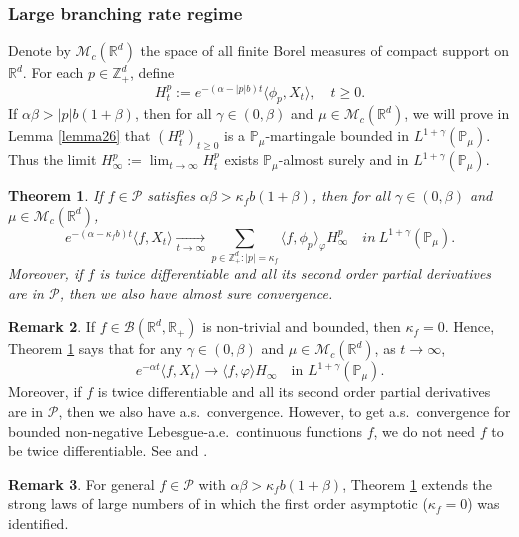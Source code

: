 \documentclass[12pt,a4paper]{amsart}
\theoremstyle{plain}
\newtheorem{thm}{Theorem}[section]
\theoremstyle{definition}
\newtheorem{rem}[thm]{Remark}
\numberwithin{equation}{section}
\begin{document}
\subsubsection{Large branching rate regime}
    Denote by $\mathcal M_c(\mathbb R^d)$ the space of all finite Borel measures of compact support on $\mathbb R^d$.
    For each $p\in \mathbb{Z}_+^d$, define
\[
    H_t^p
    := e^{-(\alpha-|p|b)t}\langle\phi_p,X_t\rangle,
    \quad t\geq 0.
\]
    If $\alpha\beta>|p|b(1+\beta)$, then for all $\gamma\in (0, \beta)$ and $\mu\in \mathcal M_c(\mathbb R^d)$,
      we will prove in Lemma \ref{lemma26} that $(H_t^p)_{t\geq 0}$ is a $\mathbb{P}_{\mu}$-martingale bounded in $L^{1+\gamma}(\mathbb{P}_{\mu})$.
    Thus the limit $H^p_{\infty}:=\lim_{t\rightarrow \infty}H_t^p$ exists $\mathbb{P}_{\mu}$-almost surely and in $L^{1+\gamma}(\mathbb{P}_{\mu})$.
 \begin{thm}
 \label{thm: law of large number}
     If $f \in \mathcal{P}$ satisfies $\alpha\beta>\kappa_fb(1+\beta)$, then
   for all
     $\gamma\in (0, \beta)$ and  $\mu\in \mathcal M_c(\mathbb R^d)$,
\[
    e^{-(\alpha-\kappa_fb)t}\langle f, X_t\rangle
       \xrightarrow[t\to \infty]{}\sum_{p\in \mathbb Z_+^d:|p|=\kappa_f}\langle f, \phi_p\rangle_{\varphi} H_{\infty}^p
    \quad in~ L^{1+\gamma}(\mathbb{P}_{\mu}).
\]
    Moreover, if $f$ is twice differentiable and all its second order partial derivatives are in $\mathcal{P}$, then we also have almost sure convergence.
\end{thm}
\begin{rem}
   If $f\in \mathcal B(\mathbb R^d, \mathbb R_+)$ is non-trivial and  bounded, then $\kappa_f=0$.
    Hence, Theorem \ref{thm: law of large number} says that
    for any $\gamma\in (0, \beta)$ and  $\mu\in \mathcal M_c(\mathbb R^d)$, as $t\rightarrow \infty$,
\[
    e^{-\alpha t}\langle f, X_t\rangle
    \rightarrow \langle f, \varphi\rangle H_{\infty}
    \quad \mbox{in } L^{1+\gamma}(\mathbb{P}_{\mu}).
\]
    Moreover, if $f$ is twice differentiable and all its second order partial derivatives are in $\mathcal{P}$, then we also have a.\/s.\ convergence.
    However, to get  a.\/s.\ convergence for bounded non-negative 
    Lebesgue-a.\/e.\/\ continuous functions $f$, we do not need $f$ to be twice differentiable. See \cite[Theorem 2.13 \& Example 8.1]{ChenRenYang2019Skeleton} and \cite[Theorem 1.2 \& Example 4.1]{EckhoffKyprianouWinkel2015Spines}.
\end{rem}
\begin{rem}
    For general $f\in \mathcal{P}$ with $\alpha\beta>\kappa_fb(1+\beta)$, Theorem \ref{thm: law of large number} extends the strong laws of large numbers of \cite{ChenRenYang2019Skeleton, EckhoffKyprianouWinkel2015Spines} in which 
the first order asymptotic ($\kappa_f=0$) was identified.
    \end{rem}
\end{document}
